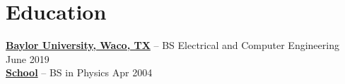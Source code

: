 \documentclass[11pt]{article}       %
\begin{document}

\vspace{-18.5pt}

\section*{Education}
\textbf{\href{https://www.baylor.edu/}{Baylor University, Waco, TX}} -- BS Electrical and Computer Engineering \hfill June 2019 \\
\textbf{\href{https://www.southharmoninstituteoftechnology.org/}{School}} -- BS in Physics \hfill Apr 2004
\end{document}
